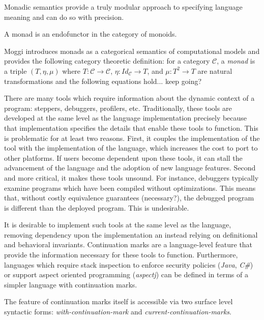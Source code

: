 \documentclass[ms]{byuprop}
\begin{document}
Monadic semantics provide a truly modular approach to specifying language meaning and can do so with precision.


A monad is an endofunctor in the category of monoids.

Moggi \cite{moggi1989computational} introduces monads as a categorical semantics of computational models and provides the following category theoretic definition: for a category $\mathcal{C}$, a \emph{monad} is a triple $(T,\eta,\mu)$ where $T:\mathcal{C}\rightarrow\mathcal{C}$, $\eta:Id_{\mathcal{C}}\rightarrow T$, and $\mu:T^{2}\rightarrow T$ are natural transformations and the following equations hold... keep going?


There are many tools which require information about the dynamic context of a program: steppers, debuggers, profilers, etc. Traditionally, these tools are developed at the same level as the language implementation precisely because that implementation specifies the details that enable these tools to function. This is problematic for at least two reasons. First, it couples the implementation of the tool with the implementation of the language, which increases the cost to port to other platforms. If users become dependent upon these tools, it can stall the advancement of the language and the adoption of new language features. Second and more critical, it makes these tools unsound. For instance, debuggers typically examine programs which have been compiled without optimizations. %
This means that, without costly equivalence guarantees (necessary?), the debugged program  is different than the deployed program. This is undesirable.

It is desirable to implement such tools at the same level as the language, removing dependency upon the implementation an instead relying on definitional and behavioral invariants. Continuation marks are a language-level feature that provide the information necessary for these tools to function. Furthermore, languages which require stack inspection to enforce security policies (\emph{Java}, \emph{C\#}) or support aspect oriented programming (\emph{aspectj}) can be defined in terms of a simpler language with continuation marks.

The feature of continuation marks itself is accessible via two surface level syntactic forms: \emph{with-continuation-mark} and \emph{current-continuation-marks}.
\end{document}
